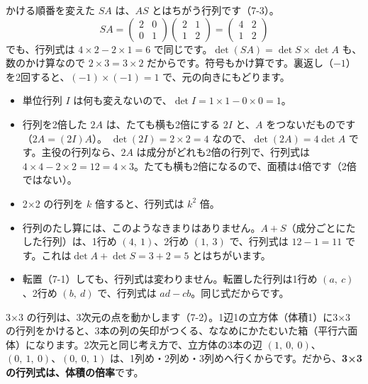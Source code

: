 \noindent かける順番を変えた $SA$ は、$AS$ とはちがう行列です（7-3）。
\[ SA=\begin{pmatrix}2&0\\0&1\end{pmatrix}\begin{pmatrix}2&1\\1&2\end{pmatrix}=\begin{pmatrix}4&2\\1&2\end{pmatrix} \]
でも、行列式は $4\times2-2\times1=6$ で同じです。$\det(SA)=\det S\times\det A$ も、数のかけ算なので $2\times3=3\times2$ だからです。符号もかけ算です。裏返し（$-1$）を2回すると、$(-1)\times(-1)=1$ で、元の向きにもどります。

\begin{itemize}[leftmargin=1.6\zw, itemsep=2pt, topsep=2pt, label={\color{\bkTT}●}]
\item 単位行列 $I$ は何も変えないので、$\det I=1\times1-0\times0=1$。
\item 行列を2倍した $2A$ は、たても横も2倍にする $2I$ と、$A$ をつないだものです（$2A=(2I)A$）。
$\det(2I)=2\times2=4$ なので、$\det(2A)=4\det A$ です。主役の行列なら、$2A$ は成分がどれも2倍の行列で、行列式は $4\times4-2\times2=12=4\times3$。たても横も2倍になるので、面積は4倍です（2倍ではない）。
\item 2×2 の行列を $k$ 倍すると、行列式は $k^2$ 倍。
\item 行列のたし算には、このようなきまりはありません。$A+S$（成分ごとにたした行列）は、1行め $(4,\ 1)$、2行め $(1,\ 3)$ で、行列式は $12-1=11$ です。これは$\det A+\det S=3+2=5$ とはちがいます。
\item 転置（7-1）しても、行列式は変わりません。転置した行列は1行め $(a,\ c)$、2行め $(b,\ d)$ で、行列式は $ad-cb$。同じ式だからです。
\end{itemize}


\leavevmode\label{bk:7-4:sanjigen}3×3 の行列は、3次元の点を動かします（7-2）。1辺1の立方体（体積1）に3×3 の行列をかけると、3本の列の矢印がつくる、ななめにかたむいた箱（平行六面体）になります。2次元と同じ考え方で、立方体の3本の辺 $(1,\ 0,\ 0)$、$(0,\ 1,\ 0)$、$(0,\ 0,\ 1)$ は、1列め・2列め・3列めへ行くからです。だから、\textbf{3×3 の行列式は、体積の倍率}です。

